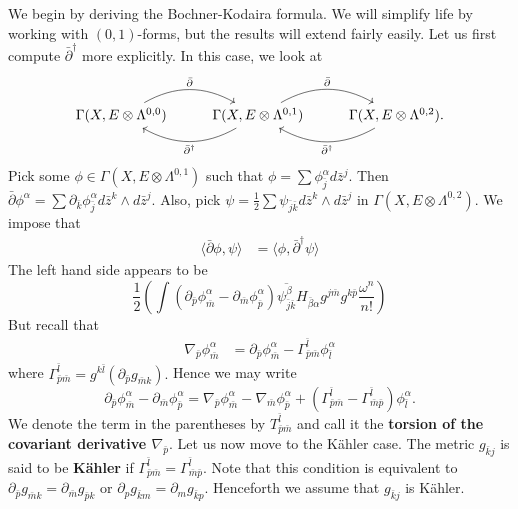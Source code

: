 \documentclass{../mathnotes}
\begin{document}
We begin by deriving the Bochner-Kodaira formula. We will simplify life by working with $(0,1)$-forms, but the results
will extend fairly easily. Let us first compute $\bar\partial^\dagger$ more explicitly. In this case, we look at
\begin{equation*}
    \begin{tikzcd}
        \Gamma(X,E\otimes\Lambda^{0,0})\arrow[bend left]{r}{\bar\partial}&\Gamma(X,E\otimes\Lambda^{0,1})\arrow[bend left]{r}{\bar\partial}\arrow[bend left]{l}{\bar\partial^\dagger} & \Gamma(X,E\otimes\Lambda^{0,2})\arrow[bend left]{l}{\bar\partial^\dagger}.
    \end{tikzcd}
\end{equation*}
Pick some $\phi\in\Gamma(X,E\otimes\Lambda^{0,1})$ such that $\phi=\sum\phi_{\bar j}^\alpha d\bar z^j$. Then $\bar\partial\phi^\alpha=\sum\partial_{\bar k}\phi_{\bar j}^\alpha d\bar z^k\wedge d\bar z^j$. Also, pick $\psi=\frac{1}{2}\sum\psi_{\bar j\bar k}d\bar z^k\wedge d\bar z^j$ in $\Gamma(X,E\otimes\Lambda^{0,2})$. We impose that
\begin{align*}
    \langle\bar\partial\phi,\psi\rangle&=\langle \phi,\bar\partial^\dagger\psi\rangle
\end{align*}
The left hand side appears to be
\[ \frac{1}{2}\left( \int(\partial_{\bar p}\phi_{\bar m}^\alpha-\partial_{\bar m}\phi^\alpha_{\bar p}) \overline{\psi_{\bar j\bar k}^\beta}H_{\bar \beta\alpha}g^{j\bar m}g^{k\bar p}\frac{\omega^n}{n!} \right)
    \]
But recall that
\begin{align*}
    \nabla_{\bar p}\phi^{\alpha}_{\bar m}&=\partial_{\bar p}\phi_{\bar m}^\alpha-\Gamma^{\bar l}_{\bar p\bar m}\phi_{\bar l}^\alpha
\end{align*}
where $\Gamma_{\bar p\bar m}^{\bar l}=g^{k\bar l}(\partial_{\bar p}g_{\bar mk}).$ Hence we may write
\[\partial_{\bar p}\phi^\alpha_{\bar m}-\partial_{\bar m}\phi_{\bar p}^\alpha=\nabla_{\bar p}\phi^\alpha_{\bar m}-\nabla_{\bar m}\phi_{\bar p}^{\alpha}+(\Gamma^{\bar l}_{\bar p\bar m}-\Gamma^{\bar l}_{\bar m\bar p})\phi_{\bar l}^\alpha.\]
We denote the term in the parentheses by $T^{\bar l}_{\bar p\bar m}$ and call it the \textbf{torsion of the covariant derivative $\nabla_{\bar p}$}. Let us now move to the K\"ahler case.
The metric $g_{\bar kj}$ is said to be \textbf{K\"ahler} if $\Gamma^{\bar l}_{\bar p\bar m}=\Gamma^{\bar l}_{\bar m\bar p}$. Note that this
condition is equivalent to $\partial_{\bar p}g_{\bar mk}=\partial_{\bar m}g_{\bar pk}$ or $\partial_pg_{\bar km}=\partial_m g_{\bar kp}$.
Henceforth we assume that $g_{\bar kj}$ is K\"ahler.
\end{document}
